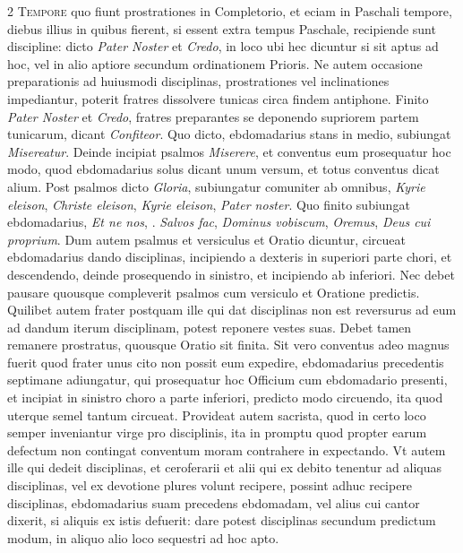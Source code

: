 \begin{multicols*}{2}
{\color{Red} }
\lettrine[lines=2]{\zallmancaps \color{Blue} T}{empore} quo fiunt prostrationes in Completorio, et eciam in Paschali tempore, diebus illius in quibus fierent, si essent extra tempus Paschale, recipiende sunt discipline: dicto \textit{Pater Noster} et \textit{Credo}, in loco ubi hec dicuntur si sit aptus ad hoc, vel in alio aptiore secundum ordinationem Prioris. Ne autem occasione preparationis ad huiusmodi disciplinas, prostrationes vel inclinationes impediantur, poterit fratres dissolvere tunicas circa findem antiphone. Finito \textit{Pater Noster} et \textit{Credo}, fratres preparantes se deponendo supriorem partem tunicarum, dicant \textit{Confiteor}. Quo dicto, ebdomadarius stans in medio, subiungat \textit{Misereatur}. Deinde incipiat psalmos \textit{Miserere}, et conventus eum prosequatur hoc modo, quod ebdomadarius solus dicant unum versum, et totus conventus dicat alium. Post psalmos dicto \textit{Gloria}, subiungatur comuniter ab omnibus, \textit{Kyrie eleison}, \textit{Christe eleison}, \textit{Kyrie eleison}, \textit{Pater noster}.
Quo finito subiungat ebdomadarius, \textit{Et ne nos}, \Vbar . \textit{Salvos fac}, \textit{Dominus vobiscum}, \textit{Oremus}, \textit{Deus cui proprium}. Dum autem psalmus et versiculus et Oratio dicuntur, circueat ebdomadarius dando disciplinas, incipiendo a dexteris in superiori parte chori, et descendendo, deinde prosequendo in sinistro, et incipiendo ab inferiori. Nec debet pausare quousque compleverit psalmos cum versiculo et Oratione predictis. Quilibet autem frater postquam ille qui dat disciplinas non est reversurus ad eum ad dandum iterum disciplinam, potest reponere vestes suas. Debet tamen remanere prostratus, quousque Oratio sit finita.
Sit vero conventus adeo magnus fuerit quod frater unus cito non possit eum expedire, ebdomadarius precedentis septimane adiungatur, qui prosequatur hoc Officium cum ebdomadario presenti, et incipiat in sinistro choro a parte inferiori, predicto modo circuendo, ita quod uterque semel tantum circueat. Provideat autem sacrista, quod in certo loco semper inveniantur virge pro disciplinis, ita in promptu quod propter earum defectum non contingat conventum moram contrahere in expectando.
Vt autem ille qui dedeit disciplinas, et ceroferarii et alii qui ex debito tenentur ad aliquas disciplinas, vel ex devotione plures volunt recipere, possint adhuc recipere disciplinas, ebdomadarius suam precedens ebdomadam, vel alius cui cantor dixerit, si aliquis ex istis defuerit: dare potest disciplinas secundum predictum modum, in aliquo alio loco sequestri ad hoc apto.


\end{multicols*}
